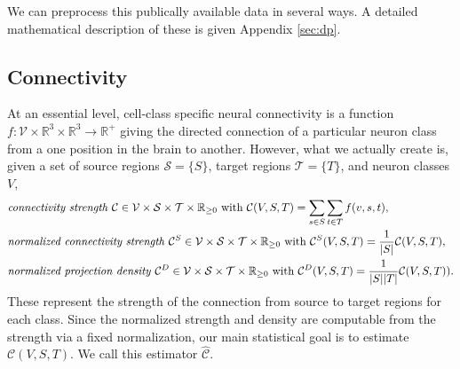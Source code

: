 We can preprocess this publically available data in several ways.
A detailed mathematical description of these is given Appendix \ref{sec:dp}.

\newpage

\subsection{Connectivity}

At an essential level, cell-class specific neural connectivity is a function $f:  \mathcal V \times \mathbb R^3 \times \mathbb R^3 \to \mathbb R^+$ giving the directed connection of a particular neuron class from a one position in the brain to another.
However, what we actually create is, given a set of source regions $\mathcal S = \{ S\} $, target regions $\mathcal T = \{ T \}$, and neuron classes $V$, 
\begin{align*}
&\text{\textit {connectivity strength} } \mathcal C \in \mathcal V \times \mathcal S \times \mathcal T \times \mathbb R_{\geq 0}  \text{ with } \mathcal C(V,S,T) = \sum_{s \in S} \sum_{t \in  T} f(v,s,t), \\
&\text{\textit {normalized connectivity strength} } \mathcal C^S \in \mathcal V \times \mathcal S \times \mathcal T \times \mathbb R_{\geq 0}  \text{ with } \mathcal C^S(V,S,T) = \frac{1}{|S|} \mathcal C(V,S,T), \\
&\text{\textit {normalized projection density} } \mathcal C^D \in \mathcal V \times \mathcal S \times \mathcal T \times \mathbb R_{\geq 0} \text{ with } \mathcal C^D(V,S,T) = \frac{1}{| S | | T|}\mathcal C(V,S,T)).
\end{align*}
These represent the strength of the connection from source to target regions for each class.
Since the normalized strength and density are computable from the strength via a fixed normalization, our main statistical goal is to estimate $\mathcal C (V,S,T)$.%
We call this estimator $\widehat { \mathcal C } $.

